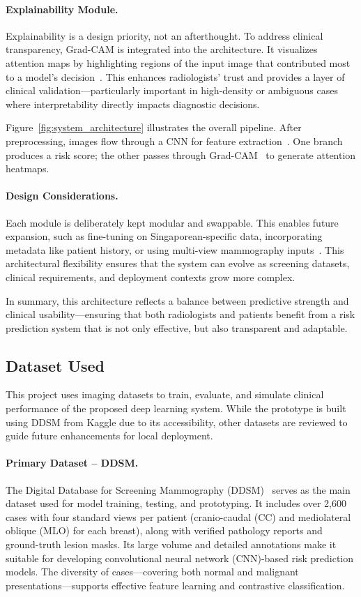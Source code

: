 \documentclass[12pt]{article}
\begin{document}
\paragraph{Explainability Module.}
Explainability is a design priority, not an afterthought. To address clinical transparency, Grad-CAM is integrated into the architecture. It visualizes attention maps by highlighting regions of the input image that contributed most to a model’s decision~\cite{5}. This enhances radiologists' trust and provides a layer of clinical validation—particularly important in high-density or ambiguous cases where interpretability directly impacts diagnostic decisions.

Figure~\ref{fig:system_architecture} illustrates the overall pipeline. After preprocessing, images flow through a CNN for feature extraction~\cite{1}. One branch produces a risk score; the other passes through Grad-CAM~\cite{5} to generate attention heatmaps.


\paragraph{Design Considerations.}
Each module is deliberately kept modular and swappable. This enables future expansion, such as fine-tuning on Singaporean-specific data, incorporating metadata like patient history, or using multi-view mammography inputs~\cite{8}. This architectural flexibility ensures that the system can evolve as screening datasets, clinical requirements, and deployment contexts grow more complex.

In summary, this architecture reflects a balance between predictive strength and clinical usability—ensuring that both radiologists and patients benefit from a risk prediction system that is not only effective, but also transparent and adaptable.

\subsection{Dataset Used}

This project uses imaging datasets to train, evaluate, and simulate clinical performance of the proposed deep learning system. While the prototype is built using DDSM from Kaggle due to its accessibility, other datasets are reviewed to guide future enhancements for local deployment.

\paragraph{Primary Dataset – DDSM.}
The Digital Database for Screening Mammography (DDSM)~\cite{17} serves as the main dataset used for model training, testing, and prototyping. It includes over 2,600 cases with four standard views per patient (cranio-caudal (CC) and mediolateral oblique (MLO) for each breast), along with verified pathology reports and ground-truth lesion masks. Its large volume and detailed annotations make it suitable for developing convolutional neural network (CNN)-based risk prediction models. The diversity of cases—covering both normal and malignant presentations—supports effective feature learning and contrastive classification.
\end{document}
